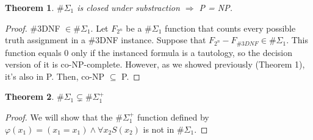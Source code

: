 \documentclass[12pt]{article}
\newtheorem{theo}{Theorem}
\begin{document}
\begin{theo}
$\#\Sigma_1$ is closed under substraction $\Rightarrow$ P = NP.
\end{theo}
\begin{proof}
\#3DNF $\in \#\Sigma_1$. Let $F_{2^n}$ be a $\#\Sigma_1$ function that counts every possible truth assignment in a \#3DNF instance. Suppose that $F_{2^n}-F_{\#3DNF} \in \#\Sigma_1$. This function equals 0 only if the instanced formula is a tautology, so the decision version of it is co-NP-complete. However, as we showed previously (Theorem 1), it's also in P. Then, co-NP $\subseteq$ P.
\end{proof}

\begin{theo}
$\#\Sigma_1 \subsetneq \#\Sigma_1^{+}$
\end{theo}
\begin{proof}
We will show that the $\#\Sigma_1^{+}$ function defined by $\varphi(x_1) = (x_1 = x_1) \wedge \forall x_2 S(x_2)$ is not in $\#\Sigma_1$.
\end{proof}
\end{document}
